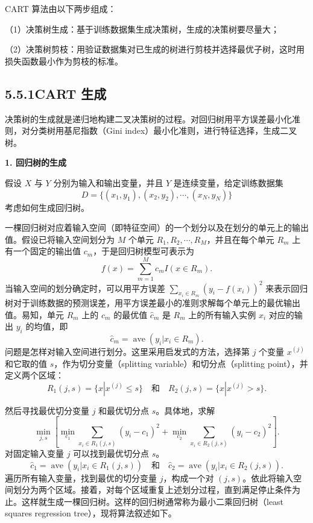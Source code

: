 \documentclass[UTF8,12pt,a4paper,fontset=fandol]{ctexart}
\begin{document}
CART 算法由以下两步组成：

（1）决策树生成：基于训练数据集生成决策树，生成的决策树要尽量大；

（2）决策树剪枝：用验证数据集对已生成的树进行剪枝并选择最优子树，这时用损失函数最小作为剪枝的标准。

\subsection*{5.5.1\quad CART 生成}

决策树的生成就是递归地构建二叉决策树的过程。对回归树用平方误差最小化准则，对分类树用基尼指数（Gini index）最小化准则，进行特征选择，生成二叉树。

\noindent\textbf{1. 回归树的生成}

假设 $X$ 与 $Y$ 分别为输入和输出变量，并且 $Y$ 是连续变量，给定训练数据集
\[
  D=\{(x_1,y_1),(x_2,y_2),\cdots,(x_N,y_N)\}
\]
考虑如何生成回归树。

一棵回归树对应着输入空间（即特征空间）的一个划分以及在划分的单元上的输出值。假设已将输入空间划分为 $M$ 个单元 $R_1,R_2,\cdots,R_M$，并且在每个单元 $R_m$ 上有一个固定的输出值 $c_m$，于是回归树模型可表示为
\begin{equation}
  f(x)=\sum_{m=1}^{M}c_mI(x\in R_m).
  \tag{5.16}
\end{equation}
当输入空间的划分确定时，可以用平方误差 $\sum_{x_i\in R_m}(y_i-f(x_i))^2$ 来表示回归树对于训练数据的预测误差，用平方误差最小的准则求解每个单元上的最优输出值。易知，单元 $R_m$ 上的 $c_m$ 的最优值 $\hat c_m$ 是 $R_m$ 上的所有输入实例 $x_i$ 对应的输出 $y_i$ 的均值，即
\begin{equation}
  \hat c_m=\operatorname{ave}(y_i|x_i\in R_m).
  \tag{5.17}
\end{equation}
问题是怎样对输入空间进行划分。这里采用启发式的方法，选择第 $j$ 个变量 $x^{(j)}$ 和它取的值 $s$，作为切分变量（splitting variable）和切分点（splitting point），并定义两个区域：
\begin{equation}
  R_1(j,s)=\{x|x^{(j)}\le s\}\quad\text{和}\quad R_2(j,s)=\{x|x^{(j)}>s\}.
  \tag{5.18}
\end{equation}

然后寻找最优切分变量 $j$ 和最优切分点 $s$。具体地，求解
\begin{equation}
  \min_{j,s}\left[
  \min_{c_1}\sum_{x_i\in R_1(j,s)}(y_i-c_1)^2+
  \min_{c_2}\sum_{x_i\in R_2(j,s)}(y_i-c_2)^2
  \right].
  \tag{5.19}
\end{equation}
对固定输入变量 $j$ 可以找到最优切分点 $s$。
\begin{equation}
  \hat c_1=\operatorname{ave}(y_i|x_i\in R_1(j,s))\quad\text{和}\quad
  \hat c_2=\operatorname{ave}(y_i|x_i\in R_2(j,s)).
  \tag{5.20}
\end{equation}
遍历所有输入变量，找到最优的切分变量 $j$，构成一个对 $(j,s)$。依此将输入空间划分为两个区域。接着，对每个区域重复上述划分过程，直到满足停止条件为止。这样就生成一棵回归树。这样的回归树通常称为最小二乘回归树（least squares regression tree），现将算法叙述如下。
\end{document}
